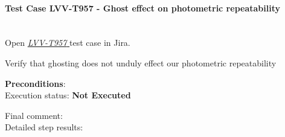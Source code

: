 \documentclass[DM,lsstdraft,STR,toc]{lsstdoc}
\begin{document}
    \paragraph{Test Case LVV-T957 - Ghost effect on photometric repeatability
 }\mbox{}\\

Open  \href{https://jira.lsstcorp.org/secure/Tests.jspa#/testCase/LVV-T957}{\textit{ LVV-T957 } }
test case in Jira.

    Verify that ghosting does not unduly effect our photometric
repeatability


    \textbf{ Preconditions}:\\
    

    Execution status: {\bf Not Executed }

    Final comment:\\


    Detailed step results:
\end{document}

